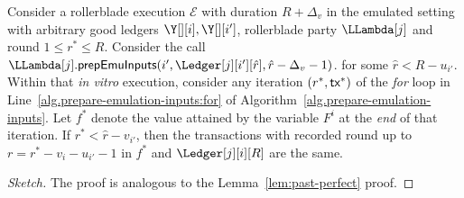\begin{lemma}\label{lem:transcription-past-perfect}
  Consider a rollerblade execution $\mathcal{E}$ with duration $R + \Delta_v$ in the emulated setting
  with arbitrary good ledgers $\Y[][i], \Y[][i']$, rollerblade party $\LLambda[j]$
  and round $1 \leq r^* \leq R$.
  Consider the call $\LLambda[j].\prepareEmulationInputs(\allowbreak i', \Ledger[j][i'][\hat{r}], \hat{r} - \Delta_v - 1)$.
  for some $\hat{r} < R - u_{i'}$.
  Within that \emph{in vitro} execution,
  consider any iteration $(r^*, \textsf{tx}^*)$ of the
  \emph{for} loop in Line~\ref{alg.prepare-emulation-inputs:for}
  of Algorithm~\ref{alg.prepare-emulation-inputs}.
  Let $f^*$ denote the value attained by the variable $F^i$
  at the \emph{end} of that iteration.
  If $r^* < \hat{r} - v_{i'}$, then
  the transactions with recorded round
  up to $r = r^* - v_i - u_{i'} - 1$ in $f^*$ and $\Ledger[j][i][R]$ are the same.
\end{lemma}
\ifshort
\begin{proof}[Sketch]
  The proof is analogous to the Lemma~\ref{lem:past-perfect} proof.
\end{proof}
\fi
\iflong
